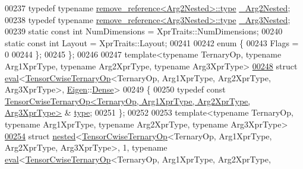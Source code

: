 \begin{DoxyCode}
00237   \textcolor{keyword}{typedef} \textcolor{keyword}{typename} \hyperlink{group___sparse_core___module}{remove\_reference<Arg2Nested>::type} 
      \hyperlink{group___sparse_core___module}{\_Arg2Nested};
00238   \textcolor{keyword}{typedef} \textcolor{keyword}{typename} \hyperlink{group___sparse_core___module}{remove\_reference<Arg3Nested>::type} 
      \hyperlink{group___sparse_core___module}{\_Arg3Nested};
00239   \textcolor{keyword}{static} \textcolor{keyword}{const} \textcolor{keywordtype}{int} NumDimensions = XprTraits::NumDimensions;
00240   \textcolor{keyword}{static} \textcolor{keyword}{const} \textcolor{keywordtype}{int} Layout = XprTraits::Layout;
00241 
00242   \textcolor{keyword}{enum} \{
00243     Flags = 0
00244   \};
00245 \};
00246 
00247 \textcolor{keyword}{template}<\textcolor{keyword}{typename} TernaryOp, \textcolor{keyword}{typename} Arg1XprType, \textcolor{keyword}{typename} Arg2XprType, \textcolor{keyword}{typename} Arg3XprType>
\hyperlink{struct_eigen_1_1internal_1_1eval_3_01_tensor_cwise_ternary_op_3_01_ternary_op_00_01_arg1_xpr_typ2e0e11b3e51fbd9d6e7353fff125bc73}{00248} \textcolor{keyword}{struct }\hyperlink{struct_eigen_1_1internal_1_1eval}{eval}<\hyperlink{class_eigen_1_1_tensor_cwise_ternary_op}{TensorCwiseTernaryOp}<TernaryOp, Arg1XprType, Arg2XprType, Arg3XprType>,
       \hyperlink{namespace_eigen}{Eigen}::\hyperlink{struct_eigen_1_1_dense}{Dense}>
00249 \{
00250   \textcolor{keyword}{typedef} \textcolor{keyword}{const} 
      \hyperlink{class_eigen_1_1_tensor_cwise_ternary_op}{TensorCwiseTernaryOp<TernaryOp, Arg1XprType, Arg2XprType, Arg3XprType>}
      & \hyperlink{class_eigen_1_1_tensor_cwise_ternary_op}{type};
00251 \};
00252 
00253 \textcolor{keyword}{template}<\textcolor{keyword}{typename} TernaryOp, \textcolor{keyword}{typename} Arg1XprType, \textcolor{keyword}{typename} Arg2XprType, \textcolor{keyword}{typename} Arg3XprType>
\hyperlink{struct_eigen_1_1internal_1_1nested_3_01_tensor_cwise_ternary_op_3_01_ternary_op_00_01_arg1_xpr_t853695dee4735ec9f7eb99fe0132afb2}{00254} \textcolor{keyword}{struct }\hyperlink{struct_eigen_1_1internal_1_1nested}{nested}<\hyperlink{class_eigen_1_1_tensor_cwise_ternary_op}{TensorCwiseTernaryOp}<TernaryOp, Arg1XprType, Arg2XprType, 
      Arg3XprType>, 1, typename \hyperlink{struct_eigen_1_1internal_1_1eval}{eval}<\hyperlink{class_eigen_1_1_tensor_cwise_ternary_op}{TensorCwiseTernaryOp}<TernaryOp, Arg1XprType, Arg2XprType, 

\end{DoxyCode}

